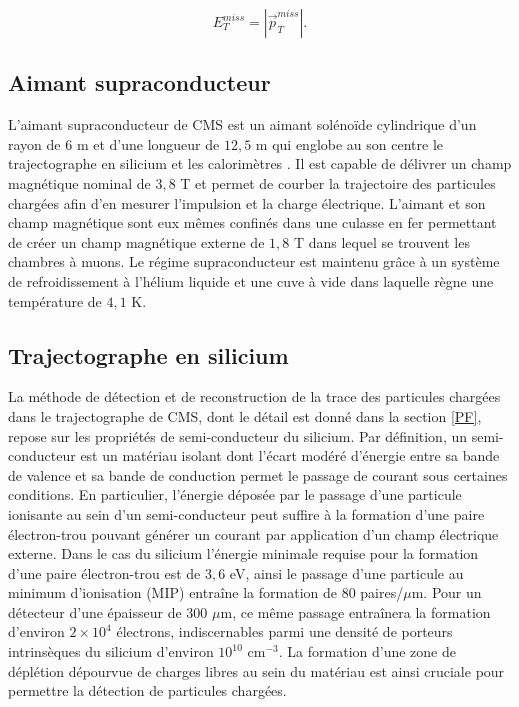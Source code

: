 $$E^{miss}_T=|\vec{p}_T^{miss}|.$$




\subsection{Aimant supraconducteur}

L'aimant supraconducteur de CMS est un aimant solénoïde cylindrique d'un rayon de $6$ m et d'une longueur de $12,5$ m qui englobe au son centre le trajectographe en silicium et les calorimètres \cite{magnet1,magnet2}. Il est capable de délivrer un champ magnétique nominal de $3,8$ T et permet de courber la trajectoire des particules chargées afin d'en mesurer l'impulsion et la charge électrique. L'aimant et son champ magnétique sont eux mêmes confinés dans une culasse en fer permettant de créer un champ magnétique externe de $1,8$ T dans lequel se trouvent les chambres à muons. Le régime supraconducteur est maintenu grâce à un système de refroidissement à l'hélium liquide et une cuve à vide dans laquelle règne une température de $4,1$ K.

\subsection{Trajectographe en silicium}

La méthode de détection et de reconstruction de la trace des particules chargées dans le trajectographe de CMS, dont le détail est donné dans la section \ref{PF}, repose sur les propriétés de semi-conducteur du silicium. Par définition, un semi-conducteur est un matériau isolant dont l'écart modéré d'énergie entre sa bande de valence et sa bande de conduction permet le passage de courant sous certaines conditions. En particulier, l'énergie déposée par le passage d'une particule ionisante au sein d'un semi-conducteur peut suffire à la formation d'une paire électron-trou pouvant générer un courant par application d'un champ électrique externe. Dans le cas du silicium l'énergie minimale requise pour la formation d'une paire électron-trou est de $3,6$ eV, ainsi le passage d'une particule au minimum d'ionisation (MIP) entraîne la formation de $80$ paires/$\mu$m. Pour un détecteur d'une épaisseur de $300$ $\mu$m, ce même passage entraînera la formation d'environ $2\times10^4$ électrons, indiscernables parmi une densité de porteurs intrinsèques du silicium d'environ $10^{10}$ cm$^{-3}$. La formation d'une zone de déplétion dépourvue de charges libres au sein du matériau est ainsi cruciale pour permettre la détection de particules chargées. \\

